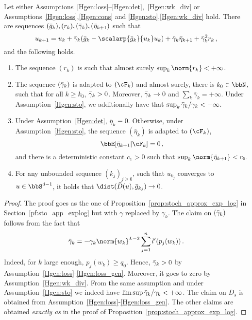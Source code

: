 \begin{proposition}\label{Pgen:stoch_approx}
  Let either Assumptions~\ref{Hgen:loss}--\ref{Hgen:det},~\ref{Hgen:wk_div} or Assumptions~\ref{Hgen:loss},\ref{Hgen:cons} and \ref{Hgen:sto},\ref{Hgen:wk_div} hold. There are sequences $(\bar{g}_k), (r_k), (\bar{\gamma}_k), (\bar{\eta}_{k+1})$ such that
  \begin{equation}\label{Egen:stoch_app_u}
    u_{k+1} = u_k + \bgamma_k(\bg_k - \scalarp{\bg_k}{u_k}u_k) + \bgamma_k \bar{\eta}_{k+1} + \bgamma_k^2 r_k\, ,
  \end{equation}
  and the following holds.
  \begin{enumerate}
    \item\label{Gpr_res:rk} The sequence $(r_k)$ is such that almost surely $\sup_{k}\norm{r_k} < + \infty$.
    \item\label{Gpr_res:gammak} The sequence $(\bar{\gamma}_k)$ is adapted to $(\cF_k)$ and almost surely, there is $k_0 \in \bbN$, such that for all $k \geq k_0$, $\bar{\gamma}_k >0$. Moreover, $\bar{\gamma}_k \rightarrow 0$ and $\sum_{k} \bar{\gamma}_k = + \infty$. Under Assumption~\ref{Hgen:sto}, we additionally have that $\sup_k \bar{\gamma}_k / \gamma_k <  +\infty$.
    \item\label{Gpr_res:etak} Under Assumption~\ref{Hgen:det}, $\bar{\eta}_{k} \equiv 0$. Otherwise, under Assumption~\ref{Hgen:sto}, the sequence $(\bar{\eta}_{k})$ is adapted to $(\cF_k)$, 
    \begin{equation*}
    \bbE[\bar{\eta}_{k+1} |\cF_k] = 0 \, ,
    \end{equation*}
    and there is a deterministic constant $c_1>0$ such that $\sup_{k} \norm{\bar{\eta}_{k+1}} < c_6$.
    \item\label{Gpr_res:barD} For any unbounded sequence $(k_j)_{j \geq 0}$, such that $u_{k_j}$ converges to $u \in \bbS^{d-1}$, it holds that $\dist(\bar{D}(u), \bg_{k_j}) \rightarrow 0$. 
  \end{enumerate}
\end{proposition}

\begin{proof}
  The proof goes as the one of Proposition~\ref{prop:stoch_approx_exp_log} in Section~\ref{pf:sto_app_explog} but with $\gamma$ replaced by $\gamma_k$. The claim on $(\bar{\gamma}_k)$ follows from the fact that 
  \begin{equation*}
    \bgamma_k = -\gamma_k \norm{w_k}^{L-2} \sum_{j=1}^n l'(p_j(w_k))\, .
  \end{equation*}
  Indeed, for $k$ large enough, $p_j(w_k) \geq q_0$. Hence, $\bar{\gamma}_k >0$ by Assumption~\ref{Hgen:loss}-\ref{Hgen:loss_gen}. Moreover, it goes to zero by Assumption~\ref{Hgen:wk_div}. From the same assumption and under Assumption~\ref{Hgen:sto} we indeed have $\limsup \bar{\gamma}_k/\gamma_k < + \infty$. 
  The claim on $\bar{D}_s$ is obtained from Assumption~\ref{Hgen:loss}-\ref{Hgen:loss_gen}. The other claims are obtained \emph{exactly as} in the proof of  Proposition~\ref{prop:stoch_approx_exp_log}.
\end{proof}

